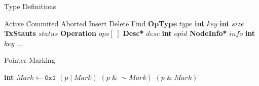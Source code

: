 \documentclass[]{sig-alternate-05-2015}
\begin{document}
\vspace{-0.1in}
\begin{algorithm}[h]
    \caption{Type Definitions}
    \label{alg:nodestructure}
    \vspace{-0.2in}
    \begin{multicols}{2}
        \begin{algorithmic}[1]
            \State Active
            \State Commited
            \State Aborted
            \EndEnum
            \State Insert
            \State Delete
            \State Find
            \EndEnum
            \State \textbf{OpType} $type$
            \State \textbf{int} $key$
            \EndStruct
            \State \textbf{int} $size$
            \State \textbf{TxStauts} $status$
            \State \textbf{Operation} $ops[\;]$
            \EndStruct
            \State \textbf{Desc*} $desc$
            \State \textbf{int} $opid$
            \EndStruct
            \State \textbf{NodeInfo*} $info$
            \State \textbf{int} $key$
            \State ...
            \EndStruct
            \end{algorithmic}
    \end{multicols}
    \vspace{-0.15in}
\end{algorithm}

\vspace{-0.2in}
\begin{algorithm}[h]
    \caption{Pointer Marking}
    \label{alg:pointermarking}
    \begin{algorithmic}[1]
        \State \textbf{int} $Mark \gets \texttt{0x1}$
         $(p\;|\;Mark)$
        \EndDefine
         $(p\;\&\;\sim Mark)$
        \EndDefine
         $(p\;\&\;Mark)$
        \EndDefine
    \end{algorithmic}
\end{algorithm}
\vspace{-0.2in}

\end{document}
